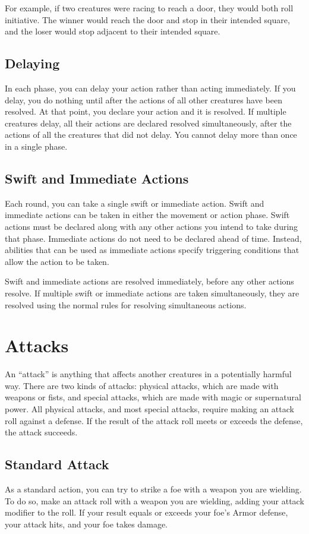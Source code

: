 For example, if two creatures were racing to reach a door, they would both roll initiative. The winner would reach the door and stop in their intended square, and the loser would stop adjacent to their intended square. 

\subsection{Delaying}\label{Delaying}
In each phase, you can delay your action rather than acting immediately. If you delay, you do nothing until after the actions of all other creatures have been resolved. At that point, you declare your action and it is resolved. If multiple creatures delay, all their actions are declared resolved simultaneously, after the actions of all the creatures that did not delay. You cannot delay more than once in a single phase.

\subsection{Swift and Immediate Actions}\label{Swift and Immediate Actions}
Each round, you can take a single swift or immediate action. Swift and immediate actions can be taken in either the movement or action phase. Swift actions must be declared along with any other actions you intend to take during that phase. Immediate actions do not need to be declared ahead of time. Instead, abilities that can be used as immediate actions specify triggering conditions that allow the action to be taken.

Swift and immediate actions are resolved immediately, before any other actions resolve. If multiple swift or immediate actions are taken simultaneously, they are resolved using the normal rules for resolving simultaneous actions.

\section{Attacks}\label{Attacks}
An ``attack'' is anything that affects another creatures in a potentially harmful way. There are two kinds of attacks: physical attacks, which are made with weapons or fists, and special attacks, which are made with magic or supernatural power. All physical attacks, and most special attacks, require making an attack roll against a defense. If the result of the attack roll meets or exceeds the defense, the attack succeeds.

\subsection{Standard Attack}
As a standard action, you can try to strike a foe with a weapon you are wielding. To do so, make an attack roll with a weapon you are wielding, adding your attack modifier to the roll. If your result equals or exceeds your foe's Armor defense, your attack hits, and your foe takes damage.

